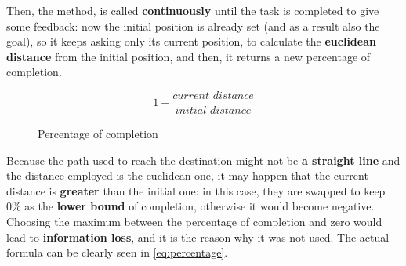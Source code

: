 Then, the  method, is called \textbf{continuously} until the task is completed to give some feedback: now the initial position is already set (and as a result also the goal), so it keeps asking only its current position, to calculate the \textbf{euclidean distance} from the initial position, and then, it returns a new percentage of completion.

\begin{wrapfigure}{r}{0.25\textwidth}
    \begin{equation*}
        1-\dfrac{current\_distance}{initial\_distance}
    \end{equation*}
    \caption{Percentage of completion}
    \label{eq:percentage}
\end{wrapfigure} 

Because the path used to reach the destination might not be \textbf{a straight line} and the distance employed is the euclidean one, it may happen that the current distance is \textbf{greater} than the initial one: in this case, they are swapped to keep 0\% as the \textbf{lower bound} of completion, otherwise it would become negative. Choosing the maximum between the percentage of completion and zero would lead to \textbf{information loss}, and it is the reason why it was not used. The actual formula can be clearly seen in \autoref{eq:percentage}.